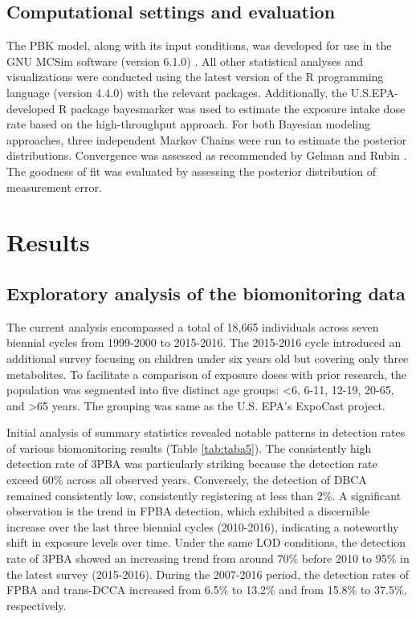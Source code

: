 \documentclass[toxics,article,submit,pdftex,moreauthors]{Definitions/mdpi}
\begin{document}
\subsection{Computational settings and
evaluation}\label{computational-settings-and-evaluation}

The PBK model, along with its input conditions, was developed for use in the
GNU MCSim software (version 6.1.0) \citep{bois_gnu_2009}. All other statistical
analyses and visualizations were conducted using the latest version of the R
programming language (version 4.4.0) with the relevant packages. Additionally,
the U.S.EPA-developed R package bayesmarker \citep{stanfield2022bayesian} was
used to estimate the exposure intake dose rate based on the high-throughput
approach. For both Bayesian modeling approaches, three independent Markov
Chains were run to estimate the posterior distributions. Convergence was
assessed as recommended by Gelman and Rubin \citep{gelman1992inference}. The
goodness of fit was evaluated by assessing the posterior distribution of
measurement error. 

\section{Results}\label{results}

\subsection{Exploratory analysis of the biomonitoring
data}\label{exploratory-analysis-of-the-biomonitoring-data}

The current analysis encompassed a total of 18,665 individuals across
seven biennial cycles from 1999-2000 to 2015-2016. The 2015-2016 cycle
introduced an additional survey focusing on children under six years old
but covering only three metabolites. To facilitate a comparison of
exposure doses with prior research, the population was segmented into
five distinct age groups: \textless6, 6-11, 12-19, 20-65, and
\textgreater65 years. The grouping was same as the U.S. EPA's ExpoCast
project.

Initial analysis of summary statistics revealed notable patterns in
detection rates of various biomonitoring results (Table
\ref{tab:taba5}). The consistently high detection rate of 3PBA was
particularly striking because the detection rate exceed 60\% across all
observed years. Conversely, the detection of DBCA remained consistently
low, consistently registering at less than 2\%. A significant
observation is the trend in FPBA detection, which exhibited a
discernible increase over the last three biennial cycles (2010-2016),
indicating a noteworthy shift in exposure levels over time. Under the
same LOD conditions, the detection rate of 3PBA showed an increasing
trend from around 70\% before 2010 to 95\% in the latest survey
(2015-2016). During the 2007-2016 period, the detection rates of FPBA
and trans-DCCA increased from 6.5\% to 13.2\% and from 15.8\% to 37.5\%,
respectively.
\end{document}
